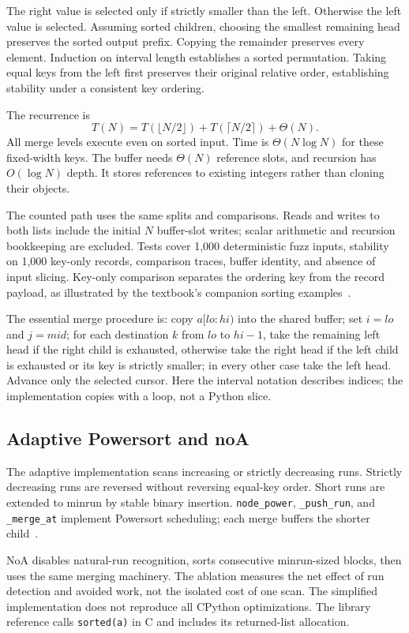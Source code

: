 \documentclass[conference]{IEEEtran}
\begin{document}
The right value is selected only if strictly smaller than the left. Otherwise the left value is selected. Assuming sorted children, choosing the smallest remaining head preserves the sorted output prefix. Copying the remainder preserves every element. Induction on interval length establishes a sorted permutation. Taking equal keys from the left first preserves their original relative order, establishing stability under a consistent key ordering.

The recurrence is
\[
T(N)=T(\lfloor N/2\rfloor)+T(\lceil N/2\rceil)+\Theta(N).
\]
All merge levels execute even on sorted input. Time is $\Theta(N\log N)$ for these fixed-width keys. The buffer needs $\Theta(N)$ reference slots, and recursion has $O(\log N)$ depth. It stores references to existing integers rather than cloning their objects.

The counted path uses the same splits and comparisons. Reads and writes to both lists include the initial $N$ buffer-slot writes; scalar arithmetic and recursion bookkeeping are excluded. Tests cover 1,000 deterministic fuzz inputs, stability on 1,000 key-only records, comparison traces, buffer identity, and absence of input slicing. Key-only comparison separates the ordering key from the record payload, as illustrated by the textbook's companion sorting examples~\cite{goodrich}.

The essential merge procedure is: copy $a[lo:hi)$ into the shared
buffer; set $i=lo$ and $j=mid$; for each destination $k$ from $lo$ to
$hi-1$, take the remaining left head if the right child is exhausted,
otherwise take the right head if the left child is exhausted or its key
is strictly smaller; in every other case take the left head. Advance
only the selected cursor. Here the interval notation describes indices;
the implementation copies with a loop, not a Python slice.

\subsection{Adaptive Powersort and noA}
The adaptive implementation scans increasing or strictly decreasing runs. Strictly decreasing runs are reversed without reversing equal-key order. Short runs are extended to minrun by stable binary insertion. \texttt{node\_power}, \texttt{\_push\_run}, and \texttt{\_merge\_at} implement Powersort scheduling; each merge buffers the shorter child~\cite{powersort,listsort}.

NoA disables natural-run recognition, sorts consecutive minrun-sized blocks, then uses the same merging machinery. The ablation measures the net effect of run detection and avoided work, not the isolated cost of one scan. The simplified implementation does not reproduce all CPython optimizations. The library reference calls \texttt{sorted(a)} in C and includes its returned-list allocation.
\end{document}
